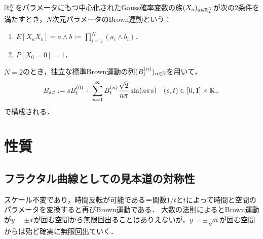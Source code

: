 \documentclass[uplatex,dvipdfmx]{jsreport}
\begin{document}
\begin{definition}
    $\mathbb{R}_+^N$をパラメータにもつ中心化されたGauss確率変数の族$(X_a)_{a\in\mathbb{R}_+^N}$が次の2条件を満たすとき，$N$次元パラメータのBrown運動という：
    \begin{enumerate}
        \item $E[X_aX_b]=a\land b:=\prod_{i=1}^N(a_i\land b_i)$．
        \item $P[X_0=0]=1$．
    \end{enumerate}
\end{definition}
\begin{proposition}
    $N=2$のとき，独立な標準Brown運動の列$(B_t^{(n)})_{n\in\mathbb{N}}$を用いて，
    \[B_{s.t}:=sB_t^{(0)}+\sum_{n=1}^\infty B_t^{(n)}\frac{\sqrt{2}}{n\pi}\sin(n\pi s)\quad(s,t)\in[0,1]\times\mathbb{R}_+\]
    で構成される．
\end{proposition}

\section{性質}

\subsection{フラクタル曲線としての見本道の対称性}

\begin{tcolorbox}[colframe=ForestGreen, colback=ForestGreen!10!white,breakable,colbacktitle=ForestGreen!40!white,coltitle=black,fonttitle=\bfseries\sffamily,
title=]
    スケール不変であり，時間反転が可能である＝関数$1/t$と$t$によって時間と空間のパラメータを変換すると再びBrown運動である．
    大数の法則によるとBrown運動が$y=\pm x$が囲む空間から無限回出ることはありえないが，$y=\pm\sqrt{n}$が囲む空間からは殆ど確実に無限回出ていく．
\end{tcolorbox}
\end{document}
